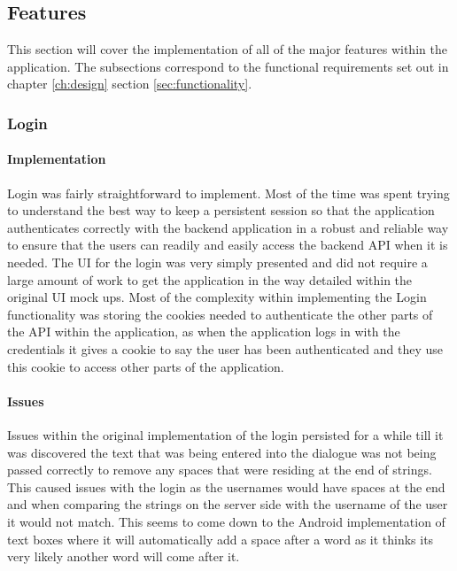 \subsection{Features}

This section will cover the implementation of all of the major features within the application. The subsections correspond to the functional requirements set out in chapter \ref{ch:design} section \ref{sec:functionality}.

\subsubsection{Login}

\paragraph*{Implementation}

Login was fairly straightforward to implement. Most of the time was spent trying to understand the best way to keep a persistent session so that the application authenticates correctly with the backend application in a robust and reliable way to ensure that the users can readily and easily access the backend API when it is needed. The UI for the login was very simply presented and did not require a large amount of work to get the application in the way detailed within the original UI mock ups. Most of the complexity within implementing the Login functionality was storing the cookies needed to authenticate the other parts of the API within the application, as when the application logs in with the credentials it gives a cookie to say the user has been authenticated and they use this cookie to access other parts of the application.

\paragraph*{Issues}

Issues within the original implementation of the login persisted for a while till it was discovered the text that was being entered into the dialogue was not being passed correctly to remove any spaces that were residing at the end of strings. This caused issues with the login as the usernames would have spaces at the end and when comparing the strings on the server side with the username of the user it would not match. This seems to come down to the Android implementation of text boxes where it will automatically add a space after a word as it thinks its very likely another word will come after it.


